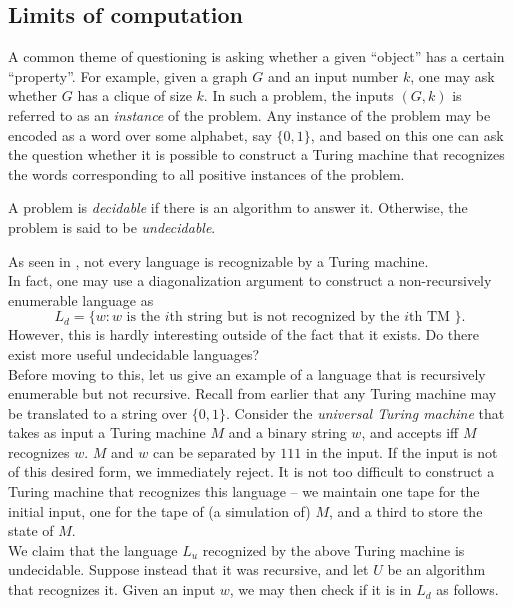 \subsection{Limits of computation}
\label{subsec: limits of computation}

	A common theme of questioning is asking whether a given ``object'' has a certain ``property''. For example, given a graph $G$ and an input number $k$, one may ask whether $G$ has a clique of size $k$. In such a problem, the inputs $(G,k)$ is referred to as an \emph{instance} of the problem. Any instance of the problem may be encoded as a word over some alphabet, say $\{0,1\}$, and based on this one can ask the question whether it is possible to construct a Turing machine that recognizes the words corresponding to all positive instances of the problem.

	\begin{fdef}
		A problem is \emph{decidable} if there is an algorithm to answer it. Otherwise, the problem is said to be \emph{undecidable}.
	\end{fdef}

	As seen in , not every language is recognizable by a Turing machine.\\
	In fact, one may use a diagonalization argument to construct a non-recursively enumerable language as
	\[ L_d = \{ w : w \text{ is the $i$th string but is not recognized by the $i$th TM } \}. \]
	However, this is hardly interesting outside of the fact that it exists. Do there exist more useful undecidable languages?\\

	Before moving to this, let us give an example of a language that is recursively enumerable but not recursive. Recall from earlier that any Turing machine may be translated to a string over $\{0,1\}$. Consider the \emph{universal Turing machine} that takes as input a Turing machine $M$ and a binary string $w$, and accepts iff $M$ recognizes $w$. $M$ and $w$ can be separated by $111$ in the input. If the input is not of this desired form, we immediately reject. It is not too difficult to construct a Turing machine that recognizes this language -- we maintain one tape for the initial input, one for the tape of (a simulation of) $M$, and a third to store the state of $M$.\\
	We claim that the language $L_u$ recognized by the above Turing machine is undecidable. Suppose instead that it was recursive, and let $U$ be an algorithm that recognizes it. Given an input $w$, we may then check if it is in $L_d$ as follows.
